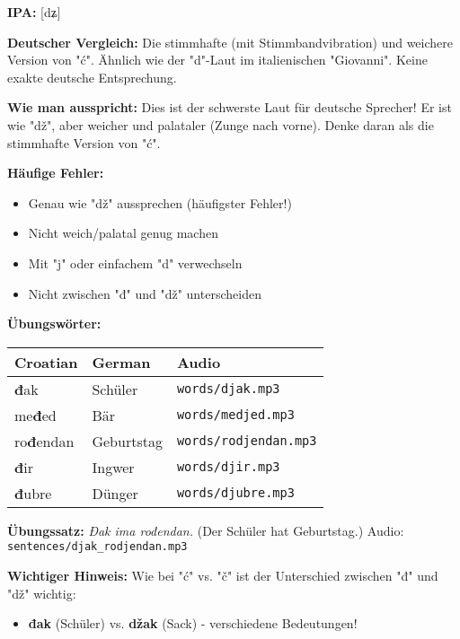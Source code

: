 \begin{tcolorbox}[breakable, colback=lightblue!30, colframe=croatianblue, title=\textbf{Đ, đ}]

\textbf{IPA:} [dʑ]

\textbf{Deutscher Vergleich:}
Die stimmhafte (mit Stimmbandvibration) und weichere Version von "ć". Ähnlich wie der "d"-Laut im italienischen "Giovanni". Keine exakte deutsche Entsprechung.

\textbf{Wie man ausspricht:}
Dies ist der schwerste Laut für deutsche Sprecher! Er ist wie "dž", aber weicher und palataler (Zunge nach vorne). Denke daran als die stimmhafte Version von "ć".

\textbf{Häufige Fehler:}
\begin{itemize}
    \item Genau wie "dž" aussprechen (häufigster Fehler!)
    \item Nicht weich/palatal genug machen
    \item Mit "j" oder einfachem "d" verwechseln
    \item Nicht zwischen "đ" und "dž" unterscheiden
\end{itemize}

\textbf{Übungswörter:}
\begin{center}
\small
\begin{tabular}{lll}
\textbf{Croatian} & \textbf{German} & \textbf{Audio} \\
\midrule
\textbf{đ}ak & Schüler & \small\texttt{words/djak.mp3} \\
me\textbf{đ}ed & Bär & \small\texttt{words/medjed.mp3} \\
ro\textbf{đ}endan & Geburtstag & \small\texttt{words/rodjendan.mp3} \\
\textbf{đ}ir & Ingwer & \small\texttt{words/djir.mp3} \\
\textbf{đ}ubre & Dünger & \small\texttt{words/djubre.mp3} \\
\end{tabular}
\end{center}

\textbf{Übungssatz:}
\textit{Đak ima rođendan.}
(Der Schüler hat Geburtstag.)
Audio: \small\texttt{sentences/djak\_rodjendan.mp3}

\textbf{Wichtiger Hinweis:}
Wie bei "ć" vs. "č" ist der Unterschied zwischen "đ" und "dž" wichtig:
\begin{itemize}
    \item \textbf{đak} (Schüler) vs. \textbf{džak} (Sack) - verschiedene Bedeutungen!
\end{itemize}

\end{tcolorbox}

